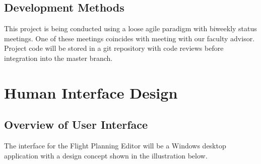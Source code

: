 \documentclass[12pt, letterpaper]{article}
\begin{document}
  \subsection{Development Methods}
    This project is being conducted using a loose agile paradigm with biweekly status meetings.
    One of these meetings coincides with meeting with our faculty advisor.
    Project code will be stored in a git repository with code reviews before integration into the master branch.

\newpage

\section{Human Interface Design} \label{sec:ui}

\subsection{Overview of User Interface}
The interface for the Flight Planning Editor will be a Windows desktop application with a design concept shown in the illustration below.
\end{document}

